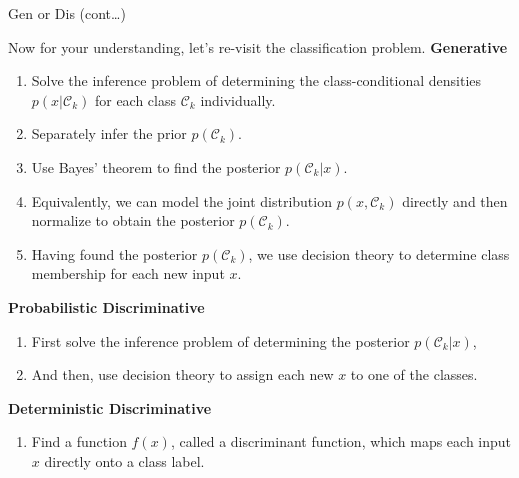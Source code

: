 \documentclass{bredelebeamer}
\begin{document}
\begin{frame}{Gen or Dis (cont\ldots)}
  \begin{justify}
    Now for your understanding, let's re-visit the classification problem.
    \vspace{0.5\baselineskip}
    \textbf{Generative} \\
      \begin{enumerate}
        \item Solve the inference problem of determining the class-conditional
              densities $p(x|\mathcal{C}_k)$ for each class $\mathcal{C}_k$ individually.
        \item Separately infer the prior $p(\mathcal{C}_k)$.
        \item Use Bayes' theorem to find the posterior $p(\mathcal{C}_k|x)$.
        \item Equivalently, we can model the joint distribution $p(x,\mathcal{C}_k)$
              directly and then normalize to obtain the posterior $p(\mathcal{C}_k)$.
        \item Having found the posterior $p(\mathcal{C}_k)$, we use decision theory
              to determine class membership for each new input $x$.
      \end{enumerate}

    \vspace{0.5\baselineskip}
    \textbf{Probabilistic Discriminative} \\
      \begin{enumerate}
        \item First solve the inference problem of determining the posterior $p(\mathcal{C}_k|x)$,
        \item And then, use decision theory to assign each new $x$ to one of the classes.
      \end{enumerate}

    \vspace{0.5\baselineskip}
    \textbf{Deterministic Discriminative} \\
      \begin{enumerate}
        \item Find a function $f(x)$, called a discriminant function, which maps
              each input $x$ directly onto a class label.
      \end{enumerate}
  \end{justify}
\end{frame}
\end{document}
